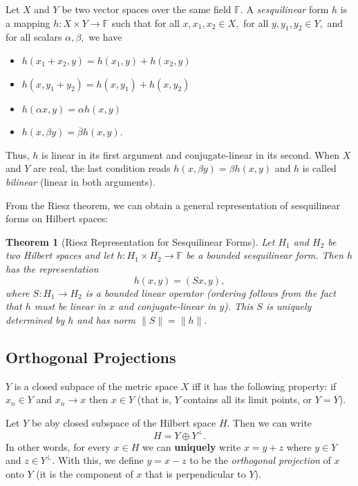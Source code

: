 \documentclass[12pt,a4paper]{article}
\theoremstyle{boldthm}
\newtheorem{theorem}{Theorem}[section]
\theoremstyle{bolddefn}
\begin{document}
Let $X$ and $Y$ be two vector spaces over the same field $\mathbb{F}.$ A \textit{sesquilinear} form $h$ is a mapping $h : X \times Y \rightarrow \mathbb{F}$ such that for all $x, x_1, x_2 \in X,$ for all $y, y_1, y_2 \in Y,$ and for all scalars $\alpha, \beta,$ we have
\begin{itemize}
    \item $h(x_1 + x_2, y) = h(x_1, y) + h(x_2, y)$
    \item $h(x, y_1 + y_2) = h(x, y_1) + h(x, y_2)$
    \item $h(\alpha x, y) = \alpha h(x, y)$
    \item $h(x, \beta y) = \overline{\beta} h(x, y).$
\end{itemize}
Thus, $h$ is linear in its first argument and conjugate-linear in its second. When $X$ and $Y$ are real, the last condition reads $h(x, \beta y) = \beta h(x, y)$ and $h$ is called \textit{bilinear} (linear in both arguments). 

From the Riesz theorem, we can obtain a general representation of sesquilinear forms on Hilbert spaces:
\begin{theorem}[Riesz Representation for Sesquilinear Forms]
    Let $H_1$ and $H_2$ be two Hilbert spaces and let $h : H_1 \times H_2 \rightarrow \mathbb{F}$ be a bounded sesquilinear form. Then $h$ has the representation 
\begin{equation}
    h(x, y) = (Sx, y),
\end{equation}
where $S : H_1 \rightarrow H_2$ is a bounded linear operator (ordering follows from the fact that $h$ must be linear in $x$ and conjugate-linear in $y$). This $S$ is uniquely determined by $h$ and has norm $\| S \| = \| h \|.$
\end{theorem}




\subsection{Orthogonal Projections \cite[Section 3.3, 9.5]{krey}}

$Y$ is a closed subpace of the metric space $X$ iff it has the following property: if $x_n \in Y$ and $x_n \rightarrow x$ then $x \in Y$ (that is, $Y$ contains all its limit points, or $Y = \overline Y$). 

Let $Y$ be aby closed subspace of the Hilbert space $H.$ Then we can write 
\begin{equation}
    H = Y  \oplus Y^\perp.
\end{equation}
In other words, for every $x \in H$ we can \textbf{uniquely} write $x = y + z$ where $y \in Y$ and $z \in Y^\perp.$ With this, we define $y = x-z$ to be the \textit{orthogonal projection} of $x$ onto $Y$ (it is the component of $x$ that is perpendicular to $Y$). 
\end{document}
